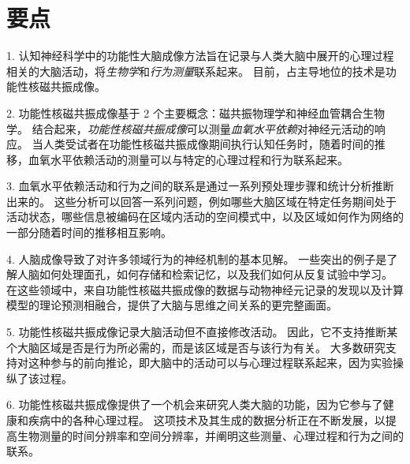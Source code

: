 \section{要点}

1. 认知神经科学中的功能性大脑成像方法旨在记录与人类大脑中展开的心理过程相关的大脑活动，将\textit{生物学}和\textit{行为测量}联系起来。
目前，占主导地位的技术是功能性核磁共振成像。


2. 功能性核磁共振成像基于 2 个主要概念：磁共振物理学和神经血管耦合生物学。
结合起来，\textit{功能性核磁共振成像}可以测量\textit{血氧水平依赖}对神经元活动的响应。
当人类受试者在功能性核磁共振成像期间执行认知任务时，随着时间的推移，血氧水平依赖活动的测量可以与特定的心理过程和行为联系起来。

3. 血氧水平依赖活动和行为之间的联系是通过一系列预处理步骤和统计分析推断出来的。
这些分析可以回答一系列问题，例如哪些大脑区域在特定任务期间处于活动状态，哪些信息被编码在区域内活动的空间模式中，以及区域如何作为网络的一部分随着时间的推移相互影响。


4. 人脑成像导致了对许多领域行为的神经机制的基本见解。
一些突出的例子是了解人脑如何处理面孔，如何存储和检索记忆，以及我们如何从反复试验中学习。
在这些领域中，来自功能性核磁共振成像的数据与动物神经元记录的发现以及计算模型的理论预测相融合，提供了大脑与思维之间关系的更完整画面。


5. 功能性核磁共振成像记录大脑活动但不直接修改活动。
因此，它不支持推断某个大脑区域是否是行为所必需的，而是该区域是否与该行为有关。
大多数研究支持对这种参与的前向推论，即大脑中的活动可以与心理过程联系起来，因为实验操纵了该过程。


6. 功能性核磁共振成像提供了一个机会来研究人类大脑的功能，因为它参与了健康和疾病中的各种心理过程。 
这项技术及其生成的数据分析正在不断发展，以提高生物测量的时间分辨率和空间分辨率，并阐明这些测量、心理过程和行为之间的联系。


